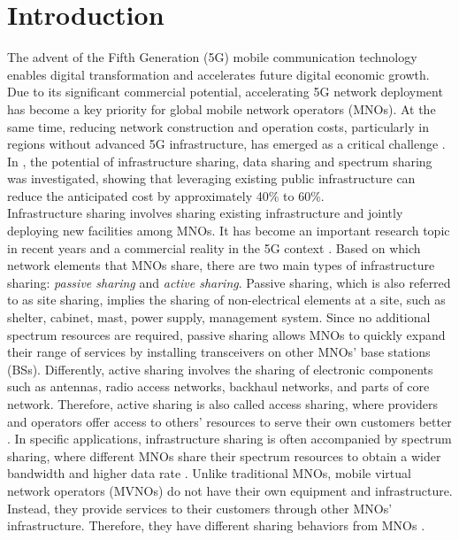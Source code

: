 \documentclass[final]{IEEEtran}
\begin{document}
\section{Introduction} \label{sec:Intro}
\indent The advent of the Fifth Generation (5G) mobile communication technology enables digital transformation and accelerates future digital economic growth. Due to its significant commercial potential, accelerating 5G network deployment has become a key priority for global mobile network operators (MNOs). At the same time, reducing network construction and operation costs, particularly in regions without advanced 5G infrastructure, has emerged as a critical challenge \cite{GSMA5GWhitepaper,ISoverview}. In \cite{8951153}, the potential of infrastructure sharing, data sharing and spectrum sharing was investigated, showing that leveraging existing public infrastructure can reduce the anticipated cost by approximately 40\% to 60\%.\\%
\indent Infrastructure sharing involves sharing existing infrastructure and jointly deploying new facilities among MNOs. It has become an important research topic in recent years and a commercial reality in the 5G context \cite{cano2020evolution}. Based on which network elements that MNOs share, there are two main types of infrastructure sharing: \textit{passive sharing} and \textit{active sharing}. Passive sharing, which is also referred to as site sharing, implies the sharing of non-electrical elements at a site, such as shelter, cabinet, mast, power supply, management system. Since no additional spectrum resources are required, passive sharing allows MNOs to quickly expand their range of services by installing transceivers on other MNOs' base stations (BSs). Differently, active sharing involves the sharing of electronic components such as antennas, radio access networks, backhaul networks, and parts of core network. Therefore, active sharing is also called access sharing, where providers and operators offer access to others' resources to serve their own customers better \cite{IS}. In specific applications, infrastructure sharing is often accompanied by spectrum sharing, where different MNOs share their spectrum resources to obtain a wider bandwidth and higher data rate \cite{7876864}. Unlike traditional MNOs, mobile virtual network operators (MVNOs) do not have their own equipment and infrastructure. Instead, they provide services to their customers through other MNOs' infrastructure. Therefore, they have different sharing behaviors from MNOs \cite{7105671}.\\
\end{document}
